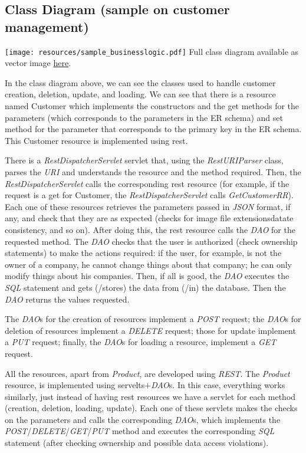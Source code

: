 \subsection{Class Diagram (sample on customer management)}


\texttt{[image: resources/sample\_businesslogic.pdf]}
Full class diagram available as vector image \href{http://bitsei.it/classdiagram/bitsei.svg}{here}.

\pagebreak

 
In the class diagram above, we can see the classes used to handle customer creation, deletion, update, and loading. We can see that there is a resource named Customer which implements the constructors and the get methods for the parameters (which corresponds to the parameters in the ER schema) and set method for the parameter that corresponds to the primary key in the ER schema. This Customer resource is implemented using rest. 

There is a \textit{RestDispatcherServlet} servlet that, using the \textit{RestURIParser} class, parses the \textit{URI} and understands the resource and the method required. Then, the \textit{RestDispatcherServlet} calls the corresponding rest resource (for example, if the request is a get for Customer, the \textit{RestDispatcherServlet} calls \textit{GetCustomerRR}). Each one of these resources retrieves the parameters passed in \textit{JSON} format, if any, and check that they are as expected (checks for image file extensionsdatate consistency, and so on). After doing this, the rest resource calls the \textit{DAO} for the requested method. The \textit{DAO} checks that the user is authorized (check ownership statements) to make the actions required: if the user, for example, is not the owner of a company, he cannot change things about that company; he can only modify things about his companies. Then, if all is good, the \textit{DAO} executes the \textit{SQL} statement and gets (/stores) the data from (/in) the database. Then the \textit{DAO} returns the values requested.

The \textit{DAO}s for the creation of resources implement a \textit{POST} request; the \textit{DAO}s for deletion of resources implement a \textit{DELETE} request; those for update implement a \textit{PUT} request; finally, the \textit{DAO}s for loading a resource, implement a \textit{GET} request.

\vspace{0.5 cm}

All the resources, apart from \textit{Product}, are developed using \textit{REST}. 
The \textit{Product} resource, is implemented using servelts+\textit{DAO}s. In this case, everything works similarly, just instead of having rest resources we have a servlet for each method (creation, deletion, loading, update). Each one of these servlets makes the checks on the parameters and calls the corresponding \textit{DAO}s, which implements the \textit{POST}/\textit{DELETE}/\textit{GET}/\textit{PUT} method and executes the corresponding \textit{SQL} statement (after checking ownership and possible data access violations).
